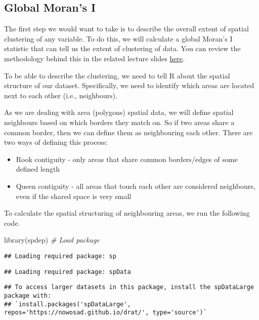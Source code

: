 \documentclass[
]{book}
\newenvironment{Shaded}{\begin{snugshade}}{\end{snugshade}}
\newcommand{\CommentTok}[1]{\textcolor[rgb]{0.56,0.35,0.01}{\textit{#1}}}
\newcommand{\FunctionTok}[1]{\textcolor[rgb]{0.00,0.00,0.00}{#1}}
\newcommand{\NormalTok}[1]{#1}
\providecommand{\tightlist}{%
  \setlength{\itemsep}{0pt}\setlength{\parskip}{0pt}}
\begin{document}
\hypertarget{global-morans-i}{%
\subsection{Global Moran's I}\label{global-morans-i}}

The first step we would want to take is to describe the overall extent of spatial clustering of any variable. To do this, we will calculate a global Moran's I statistic that can tell us the extent of clustering of data. You can review the methodology behind this in the related lecture slides \href{}{here}.

To be able to describe the clustering, we need to tell R about the spatial structure of our dataset. Specifically, we need to identify which areas are located next to each other (i.e., neighbours).

As we are dealing with area (polygons) spatial data, we will define spatial neighbours based on which borders they match on. So if two areas share a common border, then we can define them as neighbouring each other. There are two ways of defining this process:

\begin{itemize}
\tightlist
\item
  Rook contiguity - only areas that share common borders/edges of some defined length
\item
  Queen contiguity - all areas that touch each other are considered neighbours, even if the shared space is very small
\end{itemize}

To calculate the spatial structuring of neighbouring areas, we run the following code.

\begin{Shaded}
\begin{Highlighting}[]
\FunctionTok{library}\NormalTok{(spdep) }\CommentTok{\# Load package}
\end{Highlighting}
\end{Shaded}

\begin{verbatim}
## Loading required package: sp
\end{verbatim}

\begin{verbatim}
## Loading required package: spData
\end{verbatim}

\begin{verbatim}
## To access larger datasets in this package, install the spDataLarge package with:
## `install.packages('spDataLarge', repos='https://nowosad.github.io/drat/', type='source')`
\end{verbatim}
\end{document}
